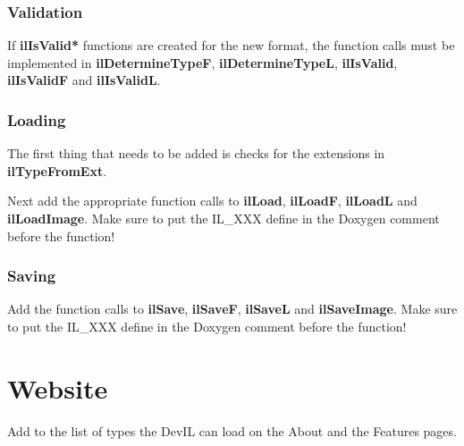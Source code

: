 \documentclass[letterpaper,10pt]{article}
\begin{document}
\subsubsection*{Validation}
If \textbf{ilIsValid*} functions are created for the new format, the function calls must be implemented in \textbf{ilDetermineTypeF}, \textbf{ilDetermineTypeL}, \textbf{ilIsValid}, \textbf{ilIsValidF} and \textbf{ilIsValidL}.

\subsubsection*{Loading}
The first thing that needs to be added is checks for the extensions in \textbf{ilTypeFromExt}.

Next add the appropriate function calls to \textbf{ilLoad}, \textbf{ilLoadF}, \textbf{ilLoadL} and \textbf{ilLoadImage}.  Make sure to put the IL\_XXX define in the Doxygen comment before the function!

\subsubsection*{Saving}
Add the function calls to \textbf{ilSave}, \textbf{ilSaveF}, \textbf{ilSaveL} and \textbf{ilSaveImage}.  Make sure to put the IL\_XXX define in the Doxygen comment before the function!


\section*{Website}
Add to the list of types the DevIL can load on the About and the Features pages.
\end{document}
